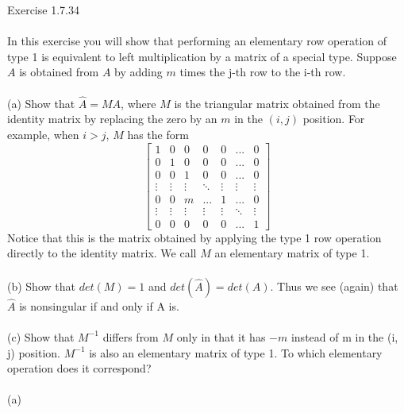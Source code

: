 \documentclass[10pt,a4paper]{article}
\author{Daniel Frederico Lins Leite}
\begin{document}
	Exercise 1.7.34\\
	\\
	In this exercise you will show that performing an elementary row operation of type 1 is equivalent to left multiplication by a matrix of a special type. Suppose $A$ is obtained from $A$ by adding $m$ times the j-th row to the i-th row.
	\\
	\\
	(a) Show that $\hat{A} = MA$, where $M$ is the triangular matrix obtained from the 
	identity matrix by replacing the zero by an $m$ in the $(i, j)$ position. For example, when $i > j$, $M$ has the form 
	$$
	\begin{bmatrix}
		1&0&0&0&0&...&0\\
		0&1&0&0&0&...&0\\
		0&0&1&0&0&...&0\\
		\vdots&\vdots&\vdots&\ddots&\vdots&\vdots&\vdots\\
		0&0&m&...&1&...&0\\
		\vdots&\vdots&\vdots&\vdots&\vdots&\ddots&\vdots\\		
		0&0&0&0&0&...&1
	\end{bmatrix}
	$$ 
	Notice that this is the matrix obtained by applying the type 1 row operation 
	directly to the identity matrix. We call $M$ an elementary matrix of type 1.\\
	\\
	(b) Show that $det(M) = 1$ and $det(\hat{A}) = det(A)$. Thus we see (again) that $\hat{A}$ is nonsingular if and only if A is. \\
	\\
	(c) Show that $M^{-1}$ differs from $M$ only in that it has $-m$ instead of m in the (i, j) 
	position. $M^{-1}$ is also an elementary matrix of type 1. To which elementary 
	operation does it correspond?\\
	\\
	(a)\\
	\\
\end{document}

